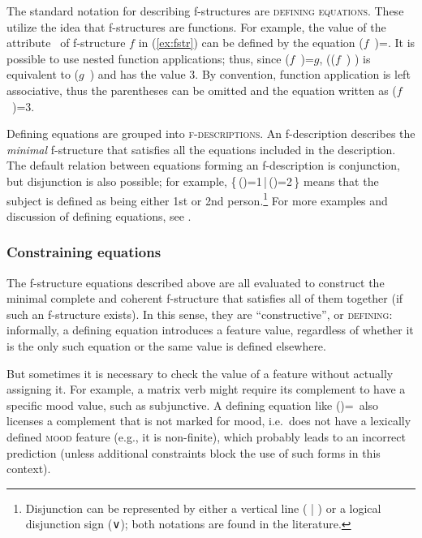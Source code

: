 \documentclass[output=paper,hidelinks]{langscibook}
\begin{document}
The standard notation for describing f-structures are \textsc{defining equations}.%
These utilize the idea that f-structures are functions. For example, the value of the attribute \TENSE\ of f-structure $f$ in (\ref{ex:fstr}) can be defined by the equation ($f$~\TENSE)=\PRS. It is possible to use nested function applications; thus, since ($f$~\SUBJ)=$g$, (($f$~\SUBJ) \PERS) is equivalent to ($g$~\PERS) and has the value $3$. By convention, function application is left associative, thus the parentheses can be omitted and the equation written as ($f$~\SUBJ\PERS)=3.

\hspace*{-2mm}Defining equations are grouped into \textsc{f-descriptions}. An f-description describes the \textit{minimal} f-structure that satisfies all the equations included in the description. The default relation between equations forming an f-description is conjunction, but disjunction is also possible; for example, \{\,(\UP\SUBJ\PERS)=1\,|\,(\UP\SUBJ\PERS)=2\,\} means that the subject is defined as being either 1st or 2nd person.\footnote{Disjunction can be represented by either a vertical line ( | ) or a logical disjunction sign (∨); both notations are found in the literature.} For more examples and discussion of defining equations, see .

 \subsubsection{Constraining equations\label{sect:constequ}}
 
 The f-structure equations described above are all evaluated to construct the minimal complete and coherent f-structure that satisfies all of them together (if such an f-structure exists). In this sense, they are ``constructive'', or \textsc{defining}: informally, a defining equation introduces a feature value, regardless of whether it is the only such equation or the same value is defined elsewhere.
 
 But sometimes it is necessary to check the value of a feature without actually assigning it. For example, a matrix verb might require its complement to have a specific mood value, such as subjunctive. A defining equation like (\UP\COMP\MOOD)=\SBJV\ also licenses a complement that is not marked for mood, i.e.\ does not have a lexically defined \textsc{mood} feature (e.g., it is non-finite), which probably leads to an incorrect prediction (unless additional constraints block the use of such forms in this context).
 
\end{document}
